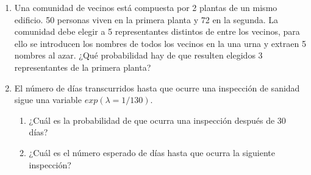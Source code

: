 \documentclass[]{article}
\theoremstyle{plain}
\theoremstyle{definition}
\theoremstyle{definition} %
\begin{document}
\begin{enumerate}
 
  \item Una comunidad de vecinos está compuesta por 2 plantas de un mismo edificio. 50 personas viven en la primera planta y 72 en la segunda.
    La comunidad debe elegir a 5 representantes distintos de entre los vecinos, para ello se introducen los nombres de todos los vecinos 
    en la una urna y extraen 5 nombres al azar. ¿Qué probabilidad hay de que resulten elegidos 3 representantes de la primera planta?
 

  \item  El número de días transcurridos hasta que ocurre una inspección de sanidad sigue una variable
  $exp(\lambda= 1/130)$. 
  \begin{enumerate}
    \item ¿Cuál es la probabilidad de que ocurra una inspección después de 30 días?
    \item ¿Cuál es el número esperado de días hasta que ocurra la siguiente inspección?
  \end{enumerate}
 
 
\end{enumerate}
\end{document}
